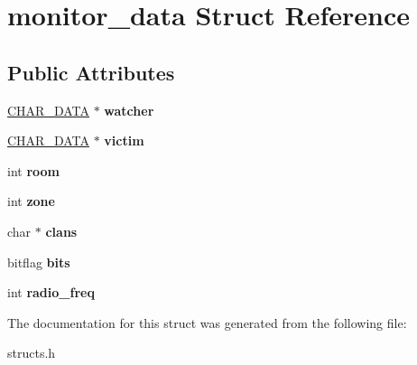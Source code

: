\hypertarget{structmonitor__data}{\section{monitor\-\_\-data Struct Reference}
\label{structmonitor__data}
}
\subsection*{Public Attributes}
\begin{DoxyCompactItemize}
\item 
\hypertarget{structmonitor__data_acee0bcdec1d76169428fb2c9969df392}{\hyperlink{structchar__data}{C\-H\-A\-R\-\_\-\-D\-A\-T\-A} $\ast$ {\bfseries watcher}}\label{structmonitor__data_acee0bcdec1d76169428fb2c9969df392}

\item 
\hypertarget{structmonitor__data_a7f3c3cbd9ec994d88d2ef6cc2cf87966}{\hyperlink{structchar__data}{C\-H\-A\-R\-\_\-\-D\-A\-T\-A} $\ast$ {\bfseries victim}}\label{structmonitor__data_a7f3c3cbd9ec994d88d2ef6cc2cf87966}

\item 
\hypertarget{structmonitor__data_a02cef827d5a5d9f5f19d57dd1b758c40}{int {\bfseries room}}\label{structmonitor__data_a02cef827d5a5d9f5f19d57dd1b758c40}

\item 
\hypertarget{structmonitor__data_aead6e5b82198d45c89c0ca33b4f4470b}{int {\bfseries zone}}\label{structmonitor__data_aead6e5b82198d45c89c0ca33b4f4470b}

\item 
\hypertarget{structmonitor__data_a25333cb59bdd5b479dc0a1453a2731e4}{char $\ast$ {\bfseries clans}}\label{structmonitor__data_a25333cb59bdd5b479dc0a1453a2731e4}

\item 
\hypertarget{structmonitor__data_a3ec9b1079db7db15fbf7b1951c821d71}{bitflag {\bfseries bits}}\label{structmonitor__data_a3ec9b1079db7db15fbf7b1951c821d71}

\item 
\hypertarget{structmonitor__data_ae2e00742ec116637315a806ed859a3f1}{int {\bfseries radio\-\_\-freq}}\label{structmonitor__data_ae2e00742ec116637315a806ed859a3f1}

\end{DoxyCompactItemize}


The documentation for this struct was generated from the following file\-:\begin{DoxyCompactItemize}
\item 
structs.\-h\end{DoxyCompactItemize}
